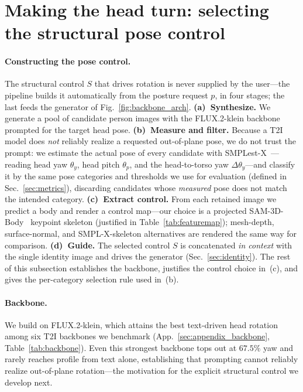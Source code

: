 \section{Making the head turn: selecting the structural pose control}
\label{sec:pose}

\paragraph{Constructing the pose control.} The structural control $S$ that drives
rotation is never supplied by the user---the pipeline builds it automatically
from the posture request $p$, in four stages; the last feeds the generator of
Fig.~\ref{fig:backbone_arch}. \textbf{(a)~Synthesize.} We generate a pool of candidate
person images with the FLUX.2-klein backbone prompted for the target head pose.
\textbf{(b)~Measure and filter.} Because a T2I model does \emph{not} reliably
realize a requested out-of-plane pose, we do not trust the prompt: we estimate
the actual pose of every candidate with SMPLest-X~\cite{smplestx}---reading head
yaw $\theta_y$, head pitch $\theta_p$, and the head-to-torso yaw
$\Delta\theta_y$---and classify it by the same pose categories and thresholds we
use for evaluation (defined in Sec.~\ref{sec:metrics}), discarding candidates whose
\emph{measured} pose does not match the intended category. \textbf{(c)~Extract control.} From each retained image we
predict a body and render a control map---our choice is a projected
SAM-3D-Body~\cite{sam} keypoint skeleton (justified in
Table~\ref{tab:featuremap}); mesh-depth, surface-normal, and SMPL-X-skeleton
alternatives are rendered the same way for comparison. \textbf{(d)~Guide.} The
selected control $S$ is concatenated \emph{in context} with the single identity
image and drives the generator (Sec.~\ref{sec:identity}). The rest of this
subsection establishes the backbone, justifies the control choice in~(c), and
gives the per-category selection rule used in~(b).

\paragraph{Backbone.} We build on FLUX.2-klein, which attains the best
text-driven head rotation among six T2I backbones we benchmark
(App.~\ref{sec:appendix_backbone}, Table~\ref{tab:backbone}). Even this strongest
backbone tops out at $67.5\%$ yaw and rarely reaches profile from text alone,
establishing that prompting cannot reliably realize out-of-plane rotation---the
motivation for the explicit structural control we develop next.

